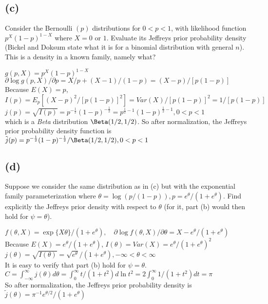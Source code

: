 \subsection*{(c)}
\ProbS
Consider the Bernoulli $(p)$ distributions for $0<p<1$, with likelihood function $p^X(1-p)^{1-X}$ where $X=0$ or $1$. Evaluate its Jeffreys prior probability density (Bickel and Doksum state what it is for a binomial distribution with general $n$). This is a density in a known family, namely what?
\ProbE

$
g(p, X) = p^X (1-p)^{1-X}
$
\\
$
\partial \log g(p, X) / \partial p = X/p + (X-1)/(1-p)
=(X-p)/[p(1-p)]
$
\\
Because $E(X)=p$, \\
$
I(p) = E_p[(X-p)^2/[p(1-p)]^2]=
Var(X)/[p(1-p)]^2 =
1/[p(1-p)]
$
\\
$
j(p) = \sqrt{I(p)} =
p^{-\frac{1}{2}}(1-p)^{-\frac{1}{2}} =
p^{\frac{1}{2}-1}(1-p)^{\frac{1}{2}-1},
0<p<1
$
\\
which is a \emph{Beta} distribution $\Beta(1/2, 1/2)$.
So after normalization, the Jeffreys prior probability density function is
\\
$
\tilde{j}(p)=
p^{-\frac{1}{2}}(1-p)^{-\frac{1}{2}}/\Beta(1/2, 1/2),
0<p<1
$
\subsection*{(d)}
\ProbS
Suppose we consider the same distribution as in (c) but with the exponential family parameterization where $\theta = \log(p/(1-p)), p=e^{\theta}/(1+e^{\theta})$. Find explicitly the Jeffreys prior density with respect to $\theta$ (for it, part (b) would then hold for $\psi = \theta$).
\ProbE

$
f(\theta, X) = \exp\{X\theta\} / (1+e^{\theta})
,\quad
\partial \log f(\theta, X) / \partial \theta = X-e^{\theta}/(1+e^\theta)
$
\\
Because $E(X)=e^{\theta}/(1+e^{\theta})$,
$
I(\theta) = Var(X) = e^\theta / (1+e^\theta)^2
$
\\
$
j(\theta) = \sqrt{I(\theta)} = \sqrt{e^\theta}/(1+e^\theta),
-\infty < \theta < \infty
$
\\
It is easy to verify that part (b) hold for $\psi=\theta$.
\\
$
C = \int_{-\infty}^{\infty} j(\theta) d\theta
= \int_{0}^{\infty} t/(1+t^2) d\ln t^2
= 2 \int_{0}^{\infty} 1/(1+t^2) dt
= \pi
$
\\
So after normalization, the Jeffreys prior probability density is\\
$
\tilde{j}(\theta) = \pi^{-1} e^{\theta/2} / (1+e^\theta)
$

